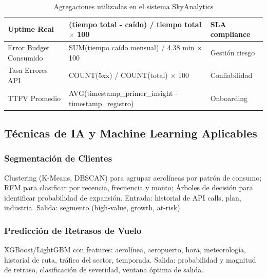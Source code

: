 ﻿\documentclass[11pt, letterpaper]{article}
\begin{document}
\begin{table}[H]
\begin{tabularx}{\linewidth}{>{\raggedright\arraybackslash}p{3.5cm} >{\raggedright\arraybackslash}p{5cm} >{\raggedright\arraybackslash}X}
Uptime Real & (tiempo total - caído) / tiempo total $\times$ 100 & SLA compliance \\

\midrule

Error Budget Consumido & SUM(tiempo caído mensual) / 4.38 min $\times$ 100 & Gestión riesgo \\

\midrule

Tasa Errores API & COUNT(5xx) / COUNT(total) $\times$ 100 & Confiabilidad \\

\midrule

TTFV Promedio & AVG(timestamp\_primer\_insight - timestamp\_registro) & Onboarding \\

\bottomrule

\end{tabularx}

\caption{Agregaciones utilizadas en el sistema SkyAnalytics}

\end{table}




\subsection{Técnicas de IA y Machine Learning Aplicables}



\subsubsection{Segmentación de Clientes}



Clustering (K-Means, DBSCAN) para agrupar aerolíneas por patrón de consumo; RFM para clasificar por recencia, frecuencia y monto; Árboles de decisión para identificar probabilidad de expansión. Entrada: historial de API calls, plan, industria. Salida: segmento (high-value, growth, at-risk).



\subsubsection{Predicción de Retrasos de Vuelo}



XGBoost/LightGBM con features: aerolínea, aeropuerto, hora, meteorología, historial de ruta, tráfico del sector, temporada. Salida: probabilidad y magnitud de retraso, clasificación de severidad, ventana óptima de salida.
\end{document}
